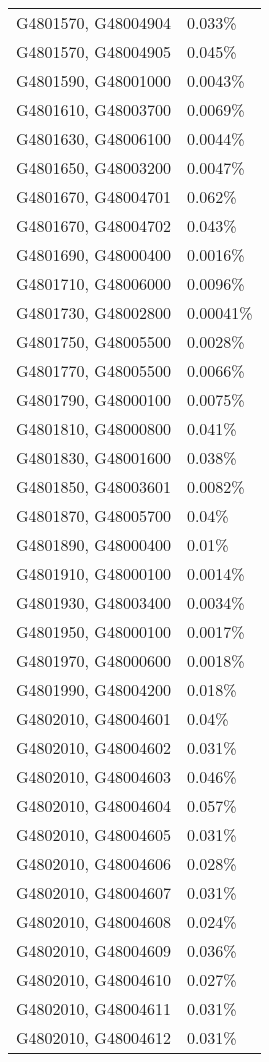 \begin{longtable}[]{@{}ll@{}}
G4801570, G48004904 & 0.033\% \\
G4801570, G48004905 & 0.045\% \\
G4801590, G48001000 & 0.0043\% \\
G4801610, G48003700 & 0.0069\% \\
G4801630, G48006100 & 0.0044\% \\
G4801650, G48003200 & 0.0047\% \\
G4801670, G48004701 & 0.062\% \\
G4801670, G48004702 & 0.043\% \\
G4801690, G48000400 & 0.0016\% \\
G4801710, G48006000 & 0.0096\% \\
G4801730, G48002800 & 0.00041\% \\
G4801750, G48005500 & 0.0028\% \\
G4801770, G48005500 & 0.0066\% \\
G4801790, G48000100 & 0.0075\% \\
G4801810, G48000800 & 0.041\% \\
G4801830, G48001600 & 0.038\% \\
G4801850, G48003601 & 0.0082\% \\
G4801870, G48005700 & 0.04\% \\
G4801890, G48000400 & 0.01\% \\
G4801910, G48000100 & 0.0014\% \\
G4801930, G48003400 & 0.0034\% \\
G4801950, G48000100 & 0.0017\% \\
G4801970, G48000600 & 0.0018\% \\
G4801990, G48004200 & 0.018\% \\
G4802010, G48004601 & 0.04\% \\
G4802010, G48004602 & 0.031\% \\
G4802010, G48004603 & 0.046\% \\
G4802010, G48004604 & 0.057\% \\
G4802010, G48004605 & 0.031\% \\
G4802010, G48004606 & 0.028\% \\
G4802010, G48004607 & 0.031\% \\
G4802010, G48004608 & 0.024\% \\
G4802010, G48004609 & 0.036\% \\
G4802010, G48004610 & 0.027\% \\
G4802010, G48004611 & 0.031\% \\
G4802010, G48004612 & 0.031\% \\

\end{longtable}
